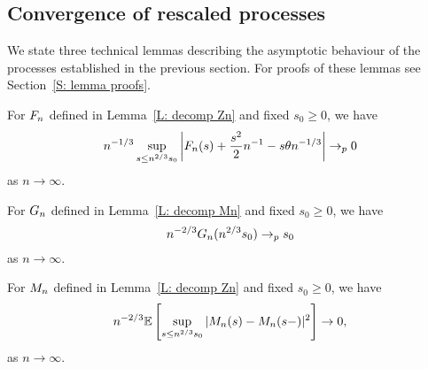 \subsection{Convergence of rescaled processes}
We state three technical lemmas describing the asymptotic behaviour of the processes established in the previous section.
For proofs of these lemmas see Section~\ref{S: lemma proofs}.

\begin{lemma} \label{L: limit An}
	For $F_n$ defined in Lemma~\ref{L: decomp Zn} and fixed $s_0 \geq 0$, we have
	\begin{equation} \label{E: limit An}
	n^{-1 / 3} \sup_{s \leq n^{2 / 3} s_0 } \left| F_n(s) + \frac{s^2}{2}n^{-1} - s\theta n^{-1 / 3} \right| \rightarrow_p 0
	\end{equation}
	as $n \rightarrow \infty$.
\end{lemma}

\begin{lemma} \label{L: limit Bn}
	For $G_n$ defined in Lemma~\ref{L: decomp Mn} and fixed $s_0 \geq 0$, we have
	\begin{equation} \label{E: limit Bn}
	n^{-2 / 3} G_n(n^{2 / 3}s_0) \rightarrow_p s_0
	\end{equation}
	as $n \rightarrow \infty$.
\end{lemma}

\begin{lemma} \label{L: limit Mn}
	For $M_n$ defined in Lemma~\ref{L: decomp Zn} and fixed $s_0 \geq 0$, we have
	\begin{equation} \label{E: limit Mn}
	n^{-2 / 3} \mathbb{E} \left[ \sup_{s \leq n^{2 / 3} s_0 } |M_n(s) - M_n(s-)|^2 \right] \rightarrow 0,
	\end{equation}
	as $n\rightarrow \infty$.
\end{lemma}

